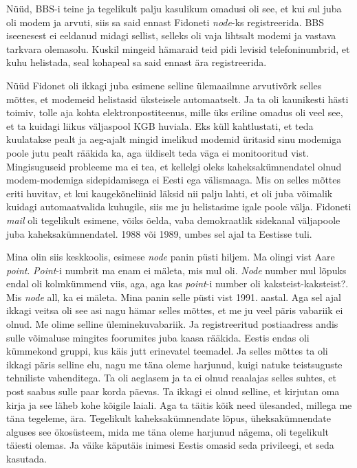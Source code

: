 Nüüd, BBS-i teine ja tegelikult palju kasulikum omadusi oli see, et kui sul 
juba 
oli modem ja arvuti, siis sa said ennast Fidoneti 
\emph{node}-ks registreerida. BBS iseenesest ei eeldanud midagi sellist, 
selleks oli vaja lihtsalt 
modemi ja vastava tarkvara olemasolu. Kuskil mingeid hämaraid teid pidi levisid 
telefoninumbrid, et kuhu helistada, seal kohapeal sa 
said ennast ära registreerida.

Nüüd Fidonet oli ikkagi juba esimene selline ülemaailmne arvutivõrk selles 
mõttes, et modemeid helistasid üksteisele automaatselt. Ja ta oli kaunikesti 
hästi toimiv,  tolle aja kohta elektronpostiteenus, mille üks  eriline omadus 
oli veel see, et ta kuidagi liikus väljaspool KGB huviala. Eks küll 
kahtlustati, et teda kuulatakse pealt ja aeg-ajalt mingid imelikud modemid 
üritasid sinu modemiga poole jutu pealt rääkida ka, aga üldiselt teda väga ei 
monitooritud vist. Mingisuguseid probleeme ma ei tea, et kellelgi oleks 
kaheksakümnendatel olnud modem-modemiga sidepidamisega ei Eesti ega 
välismaaga. Mis on selles mõttes eriti huvitav, et  kui kaugekõneliinid läksid 
 nii palju lahti, et oli juba võimalik kuidagi automaatvalida 
kuhugile, siis me ju helistasime igale poole välja.  
Fidoneti \emph{mail} oli tegelikult  esimene, võiks öelda, vaba 
demokraatlik sidekanal väljapoole juba kaheksakümnendatel. 1988 või 1989, umbes 
sel ajal ta Eestisse tuli.

Mina olin siis keskkoolis, esimese \emph{node} panin püsti hiljem. Ma olingi 
vist Aare \emph{point}. 
\emph{Point}-i numbrit ma enam ei mäleta, mis mul oli. \emph{Node} number mul 
lõpuks endal oli kolmkümmend viis, aga, aga kas \emph{point}-i number oli 
kaksteist-kaksteist?. Mis \emph{node} all, ka ei mäleta. Mina panin selle 
püsti vist 1991. aastal. Aga sel ajal  
ikkagi veitsa oli see asi nagu hämar selles mõttes, et me ju veel päris 
vabariik ei olnud. Me olime selline üleminekuvabariik. Ja  
registreeritud postiaadress andis sulle  võimaluse mingites  foorumites juba 
kaasa rääkida. Eestis endas oli kümmekond gruppi, kus käis jutt erinevatel 
teemadel. Ja selles mõttes ta oli ikkagi päris selline elu, nagu me täna oleme 
harjunud, kuigi natuke teistsuguste tehniliste vahenditega. Ta oli aeglasem ja 
ta ei olnud reaalajas selles suhtes, et post saabus sulle paar korda 
päevas. Ta ikkagi ei olnud selline, et kirjutan oma kirja ja see läheb kohe 
kõigile laiali. Aga ta täitis kõik need ülesanded, millega me täna tegeleme, 
ära. Tegelikult kaheksakümnendate lõpus, üheksakümnendate alguses see 
ökosüsteem, mida me täna oleme harjunud nägema, oli tegelikult täiesti olemas. 
Ja väike käputäis inimesi Eestis omasid seda privileegi, et seda kasutada. 

